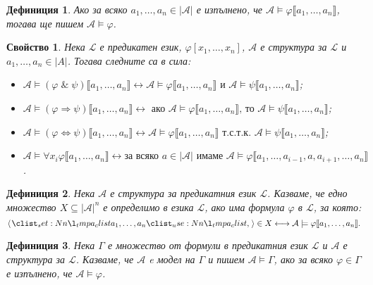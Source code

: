\documentclass[12pt]{article}
\newcommand{\logand}{\; \& \;}
\newcommand{\calA}{\mathcal{A}}
\newcommand{\calL}{\mathcal{L}}
\newcommand{\db}[1]{\llbracket #1 \rrbracket}
\newtheorem*{definition}{Дефиниция}
\newtheorem*{property}{Свойство}
\theoremstyle{definition}
\begin{document}
\begin{definition}
    Ако за всяко $a_1, \dots, a_n \in |\calA|$ е изпълнено, че $\calA \models \varphi \db{a_1, \dots, a_n}$, тогава ще пишем $\calA \models \varphi$.
\end{definition}

\newpage

\begin{property}
    Нека $\calL$ е предикатен език, $\varphi[x_1, \dots, x_n]$, $\calA$ е структура за $\calL$ и $a_1, \dots, a_n \in |A|$.
    Тогава следните са в сила:
    \begin{itemize}
        \item $\calA \models (\varphi \logand \psi) \db{a_1, \dots, a_n} \longleftrightarrow \calA \models \varphi \db{a_1, \dots, a_n} \text{ и } \calA \models \psi \db{a_1, \dots, a_n}$;
        \item $\calA \models (\varphi \Rightarrow \psi) \db{a_1, \dots, a_n} \longleftrightarrow \text{ ако }\calA \models \varphi \db{a_1, \dots, a_n} \text{, то } \calA \models \psi \db{a_1, \dots, a_n}$;
        \item $\calA \models (\varphi \Leftrightarrow \psi) \db{a_1, \dots, a_n} \longleftrightarrow \calA \models \varphi \db{a_1, \dots, a_n} \text{ т.с.т.к. } \calA \models \psi \db{a_1, \dots, a_n}$;
        \item $\calA \models \forall x_i \varphi \db{a_1, \dots, a_n} \longleftrightarrow \text{за всяко } a \in |\calA| \text{ имаме } \calA \models \varphi \db{a_1, \dots, a_{i - 1}, a, a_{i + 1}, \dots, a_n}$.
    \end{itemize}
\end{property}

\begin{definition}
    Нека $\calA$ е структура за предикатния език $\calL$.
    Казваме, че едно множество $X \subseteq |\calA|^n$ е определимо в езика $\calL$, ако има формула $\varphi$ в $\calL$, за която:
    \[
    \opair{a_1, \dots, a_n} \in X \longleftrightarrow \calA \models \varphi \db{a_1, \dots, a_n}.
    \]
\end{definition}

\begin{definition}
    Нека $\Gamma$ е множество от формули в предикатния език $\calL$ и $\calA$ е структура за $\calL$.
    Казваме, че $\calA$ e модел на $\Gamma$ и пишем $\calA \models \Gamma$, ако за всяко $\varphi \in \Gamma$ е изпълнено, че $\calA \models \varphi$.
\end{definition}
\end{document}
